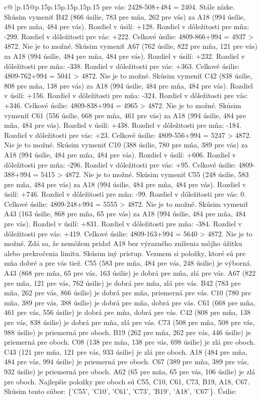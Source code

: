 \documentclass{article}
\begin{document}
{\begin{supertabular}{c@{$\;$}|p{.15\linewidth}@{}p{.15\linewidth}p{.15\linewidth}p{.15\linewidth}p{.15\linewidth}p{.15\linewidth}}
{{{pre vás: 2428{-}508+484 = 2404. Stále nízke. Skúsim vymeniť B42 (866 úsilie, 783 pre mňa, 262 pre vás) za A18 (994 úsilie, 484 pre mňa, 484 pre vás). Rozdiel v úsilí: +128. Rozdiel v dôležitosti pre mňa: {-}299. Rozdiel v dôležitosti pre vás: +222. Celkové úsilie: 4809{-}866+994 = 4937 > 4872. Nie je to možné. Skúsim vymeniť A67 (762 úsilie, 822 pre mňa, 121 pre vás) za A18 (994 úsilie, 484 pre mňa, 484 pre vás). Rozdiel v úsilí: +232. Rozdiel v dôležitosti pre mňa: {-}338. Rozdiel v dôležitosti pre vás: +363. Celkové úsilie: 4809{-}762+994 = 5041 > 4872. Nie je to možné. Skúsim vymeniť C42 (838 úsilie, 808 pre mňa, 138 pre vás) za A18 (994 úsilie, 484 pre mňa, 484 pre vás). Rozdiel v úsilí: +156. Rozdiel v dôležitosti pre mňa: {-}324. Rozdiel v dôležitosti pre vás: +346. Celkové úsilie: 4809{-}838+994 = 4965 > 4872. Nie je to možné. Skúsim vymeniť C61 (556 úsilie, 668 pre mňa, 461 pre vás) za A18 (994 úsilie, 484 pre mňa, 484 pre vás). Rozdiel v úsilí: +438. Rozdiel v dôležitosti pre mňa: {-}184. Rozdiel v dôležitosti pre vás: +23. Celkové úsilie: 4809{-}556+994 = 5247 > 4872. Nie je to možné. Skúsim vymeniť C10 (388 úsilie, 780 pre mňa, 389 pre vás) za A18 (994 úsilie, 484 pre mňa, 484 pre vás). Rozdiel v úsilí: +606. Rozdiel v dôležitosti pre mňa: {-}296. Rozdiel v dôležitosti pre vás: +95. Celkové úsilie: 4809{-}388+994 = 5415 > 4872. Nie je to možné. Skúsim vymeniť C55 (248 úsilie, 583 pre mňa, 484 pre vás) za A18 (994 úsilie, 484 pre mňa, 484 pre vás). Rozdiel v úsilí: +746. Rozdiel v dôležitosti pre mňa: {-}99. Rozdiel v dôležitosti pre vás: 0. Celkové úsilie: 4809{-}248+994 = 5555 > 4872. Nie je to možné. Skúsim vymeniť A43 (163 úsilie, 868 pre mňa, 65 pre vás) za A18 (994 úsilie, 484 pre mňa, 484 pre vás). Rozdiel v úsilí: +831. Rozdiel v dôležitosti pre mňa: {-}384. Rozdiel v dôležitosti pre vás: +419. Celkové úsilie: 4809{-}163+994 = 5640 > 4872. Nie je to možné. Zdá sa, že nemôžem pridať A18 bez výrazného zníženia môjho úžitku alebo prekročenia limitu. Skúsim iný prístup. Vezmem si položky, ktoré sú pre mňa dobré a pre vás tiež. C55 (583 pre mňa, 484 pre vás, 248 úsilie) je výborná. A43 (868 pre mňa, 65 pre vás, 163 úsilie) je dobrá pre mňa, zlá pre vás. A67 (822 pre mňa, 121 pre vás, 762 úsilie) je dobrá pre mňa, zlá pre vás. B42 (783 pre mňa, 262 pre vás, 866 úsilie) je dobrá pre mňa, priemerná pre vás. C10 (780 pre mňa, 389 pre vás, 388 úsilie) je dobrá pre mňa, dobrá pre vás. C61 (668 pre mňa, 461 pre vás, 556 úsilie) je dobrá pre mňa, dobrá pre vás. C42 (808 pre mňa, 138 pre vás, 838 úsilie) je dobrá pre mňa, zlá pre vás. C73 (508 pre mňa, 508 pre vás, 988 úsilie) je priemerná pre oboch. B19 (262 pre mňa, 262 pre vás, 446 úsilie) je priemerná pre oboch. C08 (138 pre mňa, 138 pre vás, 698 úsilie) je zlá pre oboch. C43 (121 pre mňa, 121 pre vás, 933 úsilie) je zlá pre oboch. A18 (484 pre mňa, 484 pre vás, 994 úsilie) je priemerná pre oboch. C67 (389 pre mňa, 389 pre vás, 932 úsilie) je priemerná pre oboch. A62 (65 pre mňa, 65 pre vás, 106 úsilie) je zlá pre oboch. Najlepšie položky pre oboch sú C55, C10, C61, C73, B19, A18, C67. Skúsim tento súbor: \{'C55', 'C10', 'C61', 'C73', 'B19', 'A18', 'C67'\}. Úsilie: }}}
\end{supertabular}}
\end{document}
